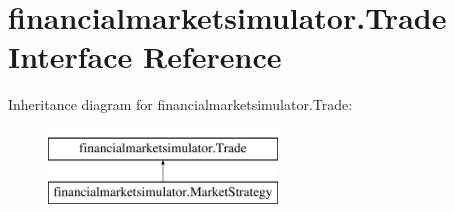 \hypertarget{interfacefinancialmarketsimulator_1_1_trade}{\section{financialmarketsimulator.\+Trade Interface Reference}
\label{interfacefinancialmarketsimulator_1_1_trade}
}
Inheritance diagram for financialmarketsimulator.\+Trade\+:\begin{figure}[H]
\begin{center}
\leavevmode
\includegraphics[height=2.000000cm]{interfacefinancialmarketsimulator_1_1_trade}
\end{center}
\end{figure}
